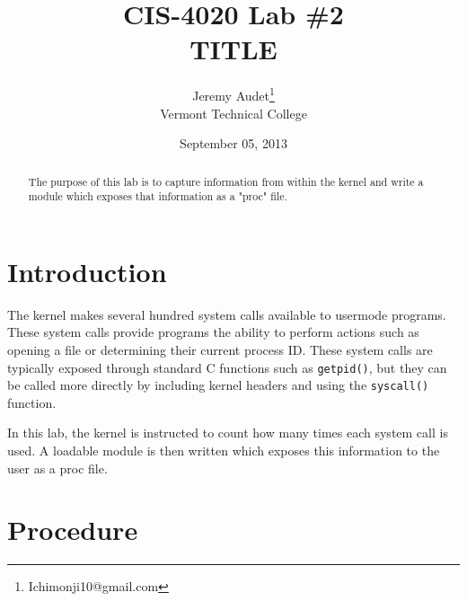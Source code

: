 \documentclass{article}
\begin{document}
\title{CIS-4020 Lab \#2\\TITLE}
\author{Jeremy Audet\thanks{Ichimonji10@gmail.com}\\
    Vermont Technical College}
    \date{September 05, 2013}
    \maketitle

\begin{abstract}
The purpose of this lab is to capture information from within the kernel
and write a module which exposes that information as a "proc" file.
\end{abstract}

\section{Introduction}
\label{sec:introduction}

The kernel makes several hundred system calls available to usermode programs.
These system calls provide programs the ability to perform actions such as
opening a file or determining their current process ID. These system calls are
typically exposed through standard C functions such as \texttt{getpid()}, but
they can be called more directly by including kernel headers and using the
\texttt{syscall()} function.

In this lab, the kernel is instructed to count how many times each system call
is used. A loadable module is then written which exposes this information to the
user as a proc file.

\section{Procedure}
\label{sec:procedure}
\end{document}
